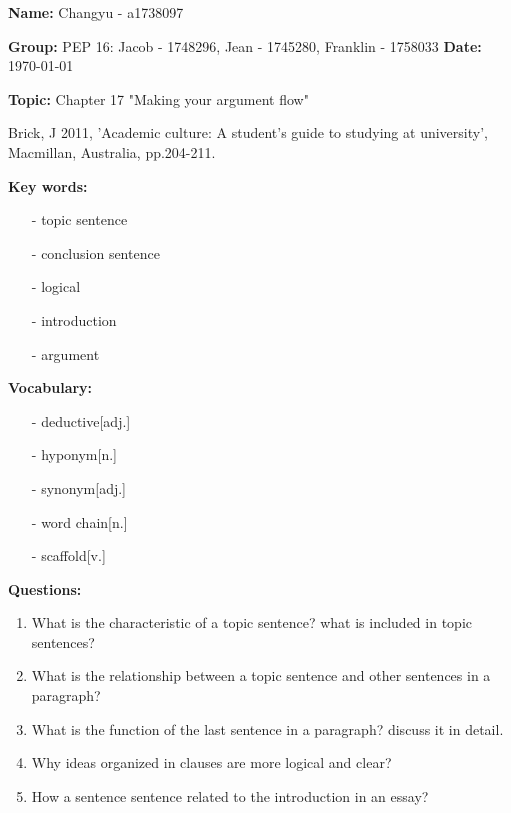 \documentclass[12pt]{article}
\begin{document}
	\thispagestyle{empty}
	\begin{spacing}{1.4}
		\textbf{Name: } Changyu - a1738097
		
		\textbf{Group: } PEP 16: Jacob - 1748296, Jean - 1745280, Franklin - 1758033
		\textbf{Date: } \today
		
		
		\textbf{Topic: } Chapter 17 "Making your argument flow"
		
		Brick, J 2011, 'Academic culture: A student's guide to studying at university', Macmillan, Australia, pp.204-211.
		
		\textbf{Key words:}    		
		\begin{itemize}
			\item[-] topic sentence
			\item[-] conclusion sentence
			\item[-] logical
			\item[-] introduction
			\item[-] argument
		\end{itemize}
		
		\textbf{Vocabulary: }
		\begin{itemize}
			\item[-] deductive[adj.]
			\item[-] hyponym[n.]
			\item[-] synonym[adj.]
			\item[-] word chain[n.]
			\item[-] scaffold[v.]
		\end{itemize}
	
		\textbf{Questions: }
		\begin{enumerate}
			\item What is the characteristic of a topic sentence? what is included in topic sentences?
			
			\item What is the relationship between a topic sentence and other sentences in a paragraph?
			
			\item What is the function of the last sentence in a paragraph? discuss it in detail.
			
			\item Why ideas organized in clauses are more logical and clear?
			
			\item How a sentence sentence related to the introduction in an essay?
		\end{enumerate}
	
	\end{spacing}
	
	
\end{document}
